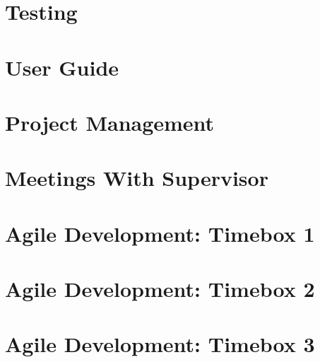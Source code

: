 \documentclass[journal, draftcls]{IEEEtran}
\begin{document}
\section{Testing}
\section{User Guide}
\section{Project Management}
\section{Meetings With Supervisor}
\section{Agile Development: Timebox 1}
\section{Agile Development: Timebox 2}
\section{Agile Development: Timebox 3}
\end{document}
